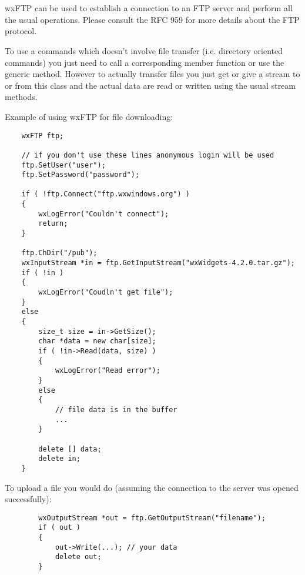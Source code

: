 
\section{}\label{wxftp}

wxFTP can be used to establish a connection to an FTP server and perform all the
usual operations. Please consult the RFC 959 for more details about the FTP
protocol.

To use a commands which doesn't involve file transfer (i.e. directory oriented
commands) you just need to call a corresponding member function or use the
generic  method. However to actually
transfer files you just get or give a stream to or from this class and the
actual data are read or written using the usual stream methods.

Example of using wxFTP for file downloading:

\begin{verbatim}
    wxFTP ftp;

    // if you don't use these lines anonymous login will be used
    ftp.SetUser("user");
    ftp.SetPassword("password");

    if ( !ftp.Connect("ftp.wxwindows.org") )
    {
        wxLogError("Couldn't connect");
        return;
    }

    ftp.ChDir("/pub");
    wxInputStream *in = ftp.GetInputStream("wxWidgets-4.2.0.tar.gz");
    if ( !in )
    {
        wxLogError("Coudln't get file");
    }
    else
    {
        size_t size = in->GetSize();
        char *data = new char[size];
        if ( !in->Read(data, size) )
        {
            wxLogError("Read error");
        }
        else
        {
            // file data is in the buffer
            ...
        }

        delete [] data;
        delete in;
    }
\end{verbatim}

To upload a file you would do (assuming the connection to the server was opened
successfully):

\begin{verbatim}
        wxOutputStream *out = ftp.GetOutputStream("filename");
        if ( out )
        {
            out->Write(...); // your data
            delete out;
        }
\end{verbatim}

